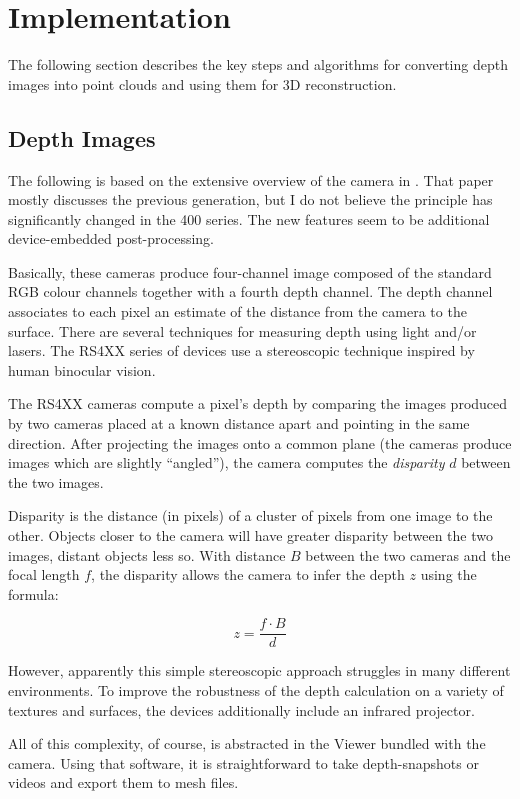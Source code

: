 \section{Implementation}

The following section describes the key steps and algorithms for converting
depth images into point clouds and using them for 3D reconstruction.

\subsection{Depth Images}
The following is based on the extensive overview of the camera in \cite{keselman2017intel}.
That paper mostly discusses the previous generation, but I do not believe the principle
has significantly changed in the 400 series. The new features seem to be
additional device-embedded post-processing.

Basically, these cameras produce four-channel image composed of the standard RGB colour channels together with a fourth depth channel. The depth channel associates to each pixel an estimate of the distance from the camera to the surface. There are several techniques for measuring depth using
light and/or lasers. The RS4XX series of devices use a stereoscopic technique inspired by human
binocular vision.

The RS4XX cameras compute a pixel's depth by comparing the images
produced by two cameras placed at a known distance apart and pointing in the same direction.
After projecting the images onto a common plane
(the cameras produce images which are slightly ``angled''), the camera computes the \textit{disparity}
 $d$ between the two images.

Disparity is the distance (in pixels) of a cluster of pixels from one image to the other.
Objects closer to the camera will have greater disparity between the two images, distant
objects less so.
With distance $B$ between the two cameras and the focal length $f$, the disparity allows the camera
to infer the depth $z$ using the formula:

\[ z = \frac{f \cdot B}{d} \]

However, apparently this simple stereoscopic approach struggles in many different
environments. To improve the robustness of the depth calculation on a variety
of textures and surfaces, the devices additionally include an infrared projector.

All of this complexity, of course, is abstracted in the Viewer bundled with the camera.
Using that software, it is straightforward to take depth-snapshots or videos
and export them to mesh files.


